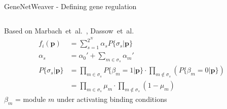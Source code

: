 \begin{frame}{GeneNetWeaver - Defining gene regulation}
\begin{columns}
\begin{column}{0.5\textwidth}
\small
Based on Marbach~et~al.~\cite{Marbach2010}, Dassow~et~al.~\cite{GeneNetWeaverModel}
\normalsize
\begin{subequations}
\label{eq:gnw_f}
\begin{align}
\label{eq:gnw_f.a}
f_i(\boldsymbol{p}) &=
\sum_{s=1}^{2^N} \alpha_s P\{\sigma_s | \boldsymbol{p} \}
\\
\label{eq:gnw_f.b}
\alpha_s &=
\alpha_0' + \sum_{m \in \sigma_s} \alpha_m'
\\
\label{eq:gnw_f.c}
P\{\sigma_s | \boldsymbol{p} \} &=
\prod_{m \in \sigma_s} P\{\beta_m=1|\boldsymbol{p}\} \cdot \prod_{m \notin \sigma_s} \left( P\{\beta_m=0|\boldsymbol{p}\} \right)
\\
\label{eq:gnw_f.d}
&=
\prod_{m \in \sigma_s} \mu_m \cdot \prod_{m \notin \sigma_s} \left( 1 - \mu_m \right)
\end{align}
\end{subequations}
$\beta_m$ = module $m$ under activating binding conditions
\end{column}


\end{columns}
\end{frame}
